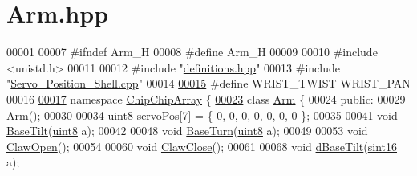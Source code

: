 \hypertarget{Arm_8hpp_source}{\section{Arm.\+hpp}
\label{Arm_8hpp_source}
}

\begin{DoxyCode}
00001 
00007 \textcolor{preprocessor}{#ifndef Arm\_H}
00008 \textcolor{preprocessor}{#define Arm\_H}
00009 
00010 \textcolor{preprocessor}{#include <unistd.h>}
00011 
00012 \textcolor{preprocessor}{#include "\hyperlink{definitions_8hpp}{definitions.hpp}"}
00013 \textcolor{preprocessor}{#include "\hyperlink{Servo__Position__Shell_8cpp}{Servo\_Position\_Shell.cpp}"}
00014 
\hypertarget{Arm_8hpp_source_l00015}{}\hyperlink{Arm_8hpp_a02a3a5fbd2fb97badde7f301b7499e05}{00015} \textcolor{preprocessor}{#define WRIST\_TWIST WRIST\_PAN}
00016 
\hypertarget{Arm_8hpp_source_l00017}{}\hyperlink{namespaceChipChipArray}{00017} \textcolor{keyword}{namespace }\hyperlink{namespaceChipChipArray}{ChipChipArray} \{
\hypertarget{Arm_8hpp_source_l00023}{}\hyperlink{classChipChipArray_1_1Arm}{00023}     \textcolor{keyword}{class }\hyperlink{classChipChipArray_1_1Arm}{Arm} \{
00024         \textcolor{keyword}{public}:
00029             \hyperlink{classChipChipArray_1_1Arm_aeda43d8461e50eaca9aa891ee2863c05}{Arm}();
00030 
\hypertarget{Arm_8hpp_source_l00034}{}\hyperlink{classChipChipArray_1_1Arm_a9ddcea9544b6e2a4315b9dd705df8fdd}{00034}             \hyperlink{definitions_8hpp_adde6aaee8457bee49c2a92621fe22b79}{uint8} \hyperlink{classChipChipArray_1_1Arm_a9ddcea9544b6e2a4315b9dd705df8fdd}{servoPos}[7] = \{ 0, 0, 0, 0, 0, 0, 0 \};
00035 
00041             \textcolor{keywordtype}{void} \hyperlink{classChipChipArray_1_1Arm_a8b077a3791d9fc5ef285c1520fe4c5d8}{BaseTilt}(\hyperlink{definitions_8hpp_adde6aaee8457bee49c2a92621fe22b79}{uint8} a);
00042 
00048             \textcolor{keywordtype}{void} \hyperlink{classChipChipArray_1_1Arm_addaedfe85ff2b14ff00c344fc4b40cd6}{BaseTurn}(\hyperlink{definitions_8hpp_adde6aaee8457bee49c2a92621fe22b79}{uint8} a);
00049 
00053             \textcolor{keywordtype}{void} \hyperlink{classChipChipArray_1_1Arm_abb33b5bb11034554d632f8c9b95b2c44}{ClawOpen}();
00054 
00060             \textcolor{keywordtype}{void} \hyperlink{classChipChipArray_1_1Arm_a20c6fe3fe79c16f492a8c18b91427080}{ClawClose}();
00061 
00068             \textcolor{keywordtype}{void} \hyperlink{classChipChipArray_1_1Arm_af84b91c664baec0f2882dcf4089ae027}{dBaseTilt}(\hyperlink{definitions_8hpp_a74df79fde3c518e55b29ce6360a9c76e}{sint16} a);

\end{DoxyCode}
